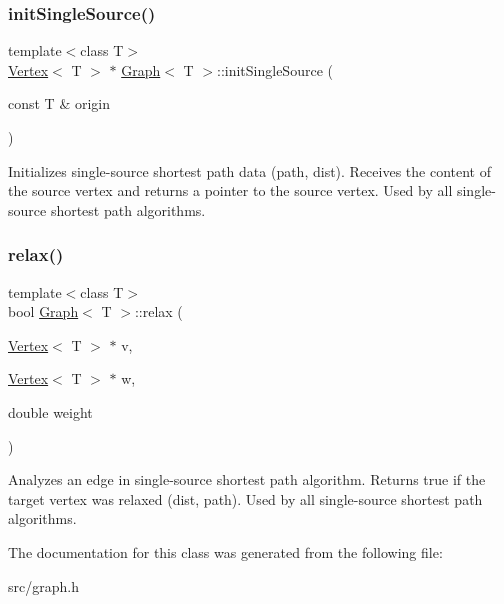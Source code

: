 \subsubsection{\texorpdfstring{init\+Single\+Source()}{initSingleSource()}}
{\footnotesize\ttfamily template$<$class T$>$ \\
\mbox{\hyperlink{class_vertex}{Vertex}}$<$ T $>$ $\ast$ \mbox{\hyperlink{class_graph}{Graph}}$<$ T $>$\+::init\+Single\+Source (\begin{DoxyParamCaption}\item[{const T \&}]{origin }\end{DoxyParamCaption})}

Initializes single-\/source shortest path data (path, dist). Receives the content of the source vertex and returns a pointer to the source vertex. Used by all single-\/source shortest path algorithms. \mbox{\label{class_graph_a2cb89dd50ee5fee83ccd9204b80af055}} 
\subsubsection{\texorpdfstring{relax()}{relax()}}
{\footnotesize\ttfamily template$<$class T$>$ \\
bool \mbox{\hyperlink{class_graph}{Graph}}$<$ T $>$\+::relax (\begin{DoxyParamCaption}\item[{\mbox{\hyperlink{class_vertex}{Vertex}}$<$ T $>$ $\ast$}]{v,  }\item[{\mbox{\hyperlink{class_vertex}{Vertex}}$<$ T $>$ $\ast$}]{w,  }\item[{double}]{weight }\end{DoxyParamCaption})}

Analyzes an edge in single-\/source shortest path algorithm. Returns true if the target vertex was relaxed (dist, path). Used by all single-\/source shortest path algorithms. 

The documentation for this class was generated from the following file\+:\begin{DoxyCompactItemize}
\item 
src/graph.\+h\end{DoxyCompactItemize}
